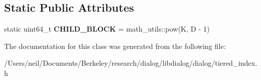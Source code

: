 \subsection*{Static Public Attributes}
\begin{DoxyCompactItemize}
\item 
\mbox{\label{classdialog_1_1index_1_1tiered__index_a11c55b5e24ed685f71dcdc6e5e52ed5d}} 
static uint64\+\_\+t {\bfseries C\+H\+I\+L\+D\+\_\+\+B\+L\+O\+CK} = math\+\_\+utils\+::pow(K, D -\/ 1)
\end{DoxyCompactItemize}


The documentation for this class was generated from the following file\+:\begin{DoxyCompactItemize}
\item 
/\+Users/neil/\+Documents/\+Berkeley/research/dialog/libdialog/dialog/tiered\+\_\+index.\+h\end{DoxyCompactItemize}
